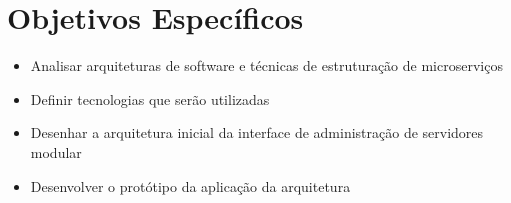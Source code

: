 \section{Objetivos Específicos}

  \begin{itemize}
    \item Analisar arquiteturas de software e técnicas de estruturação de microserviços
    \item Definir tecnologias que serão utilizadas
    \item Desenhar a arquitetura inicial da interface de administração de servidores modular
    \item Desenvolver o protótipo da aplicação da arquitetura
  \end{itemize}
